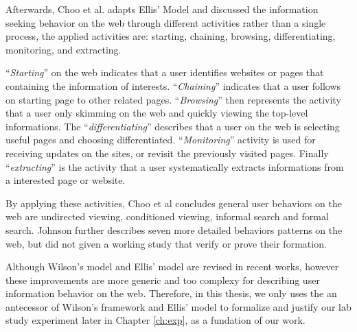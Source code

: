 Afterwards, Choo et al. adapts Ellis' Model and discussed \cite{choo1999information}
the information seeking behavior on the web through different activities rather 
than a single process, the applied activities are:
starting, chaining, browsing, differentiating, monitoring, and extracting.

``\emph{Starting}'' on the web indicates that a user identifies websites or pages
that containing the information of interests.
``\emph{Chaining}'' indicates that a user follows on starting page to other related pages.
``\emph{Browsing}'' then represents the activity that a user only skimming on the web
and quickly viewing the top-level informations. The ``\emph{differentiating}'' 
describes that a user on the web is selecting useful pages and choosing differentiated.
``\emph{Monitoring}'' activity is used for receiving updates on the sites, or revisit
the previously visited pages. Finally ``\emph{extracting}'' is the activity that a user
systematically extracts informations from a interested page or website.

By applying these activities, Choo et al concludes general user behaviors on the web are
undirected viewing, conditioned viewing, informal search and formal search.
Johnson further describes \cite{johnson2017patterns} seven more detailed behaviors 
patterns on the web, but did not given a working study that verify or prove their formation.

Although Wilson's model and Ellis' model are revised in recent works, however these improvements
are more generic and too complexy for describing user information behavior on the web.
Therefore, in this thesis, we only uses the an antecessor of Wilson's framework \cite{wilson1997information} and 
Ellis' model \cite{ellis1997modelling} to formalize and justify our lab study experiment later in Chapter \ref{ch:exp}, 
as a fundation of our work.


\cleardoublepage